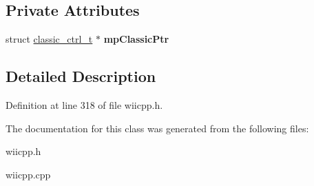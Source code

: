 \subsection*{Private Attributes}
\begin{DoxyCompactItemize}
\item 
\hypertarget{class_c_classic_a6fd9bbfe830df5a3daed2c912b593f02}{struct \hyperlink{structclassic__ctrl__t}{classic\-\_\-ctrl\-\_\-t} $\ast$ {\bfseries mp\-Classic\-Ptr}}\label{class_c_classic_a6fd9bbfe830df5a3daed2c912b593f02}

\end{DoxyCompactItemize}


\subsection{Detailed Description}


Definition at line 318 of file wiicpp.\-h.



The documentation for this class was generated from the following files\-:\begin{DoxyCompactItemize}
\item 
wiicpp.\-h\item 
wiicpp.\-cpp\end{DoxyCompactItemize}
